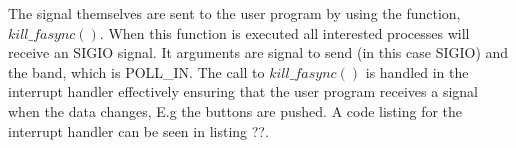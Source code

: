 The signal themselves are sent to the user program by using the function, $kill\_fasync()$. When this function is executed all interested processes will receive an SIGIO signal. It arguments are signal to send (in this case SIGIO) and the band, which is POLL\_IN. The call to $kill\_fasync()$ is handled in the interrupt handler effectively ensuring that the user program receives a signal when the data changes, E.g the buttons are pushed. A code listing for the interrupt handler can be seen in listing ??.



 









